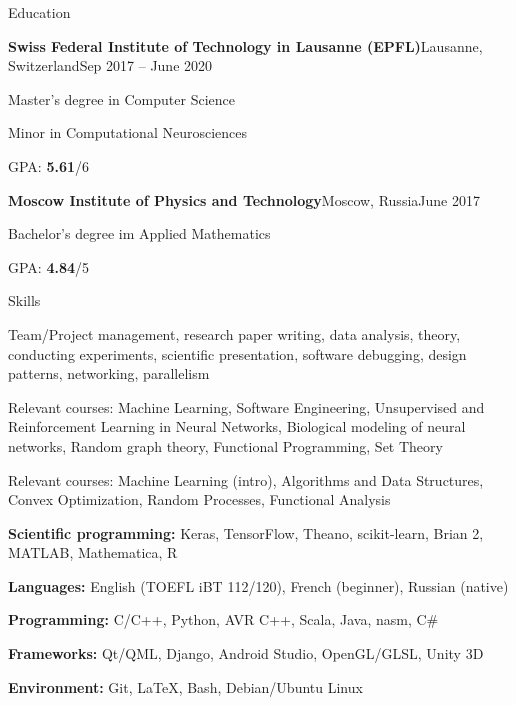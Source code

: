 \documentclass{resume} %
\begin{document}
\begin{rSection}{Education}
\hspace{-1em}
\begin{rSubsection}{\bf Swiss Federal Institute of Technology in Lausanne (EPFL)}{}{Lausanne, Switzerland}{Sep 2017 -- June 2020}
\item Master's degree in Computer Science
\item Minor in Computational Neurosciences
\item GPA: {\bf 5.61}/6
\end{rSubsection}

\begin{rSubsection}{\bf Moscow Institute of Physics and Technology}{}{Moscow, Russia}{June 2017}
\item Bachelor's degree im Applied Mathematics
\item GPA: {\bf 4.84}/5
\end{rSubsection}
\end{rSection}

\begin{rSection}{Skills}
	\item Team/Project management, research paper writing, data analysis, theory, conducting experiments, scientific presentation, software debugging, design patterns, networking, parallelism
	\item Relevant courses: Machine Learning, Software Engineering,
	{\small Unsupervised and Reinforcement Learning in Neural Networks, Biological modeling of neural networks, Random graph theory, Functional Programming, Set Theory}
	\item Relevant courses: Machine Learning (intro), Algorithms and Data Structures, Convex Optimization, Random Processes, Functional Analysis
	\item {\bf Scientific programming:} Keras, TensorFlow, Theano, scikit-learn, Brian 2, MATLAB, Mathematica, R
	\item {\bf Languages:} English (TOEFL iBT 112/120), French (beginner), Russian (native)
	\item {\bf Programming:} C/C++, Python, AVR C++, Scala, Java, nasm, C\#
	\item {\bf Frameworks:} Qt/QML, Django, Android Studio, OpenGL/GLSL, Unity 3D
	\item {\bf Environment:} Git, \LaTeX, Bash, Debian/Ubuntu Linux
\end{rSection}
\end{document}
